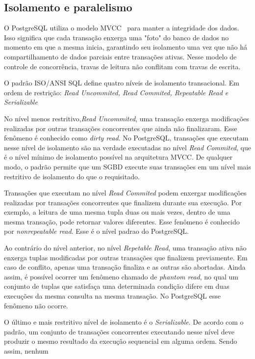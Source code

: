 \documentclass[conference]{IEEEtran}
\begin{document}
\subsection{Isolamento e paralelismo}
O PostgreSQL utiliza o modelo MVCC~\cite{NAV} para manter a integridade dos dados. Isso significa que cada transação enxerga uma "foto"
do banco de dados no momento em que a mesma inicia, garantindo seu isolamento uma vez que não há compartilhamento de dados
parciais entre transações ativas. Nesse modelo de controle de concorrência, travas de leitura não conflitam com travas de escrita.
\par O padrão ISO/ANSI SQL define quatro níveis de isolamento transacional. Em ordem de restrição: \emph{
Read Uncommited, Read Commited, Repeatable Read e Serializable}
\par No nível menos restritivo,\emph{Read Uncommited}, uma transação enxerga modificações realizadas por outras transações
concorrentes que ainda não finalizaram. Esse fenômeno é conhecido como \emph{dirty read}. No PostgreSQL, transações que executam
nesse nível de isolamento são na verdade executadas no nível \emph{Read Commited}, que é o nível mínimo de isolamento possível
na arquitetura MVCC. De qualquer modo, o padrão permite que um SGBD execute suas transações em um nível mais restritivo
de isolamento do que o requisitado.
\par Transações que executam no nível \emph{Read Commited} podem enxergar modificações realizadas por transações concorrentes
que finalizem durante sua execução. Por exemplo, a leitura de uma mesma tupla duas ou mais vezes, dentro de uma mesma transação,
pode retornar valores diferentes. Esse fenômeno é conhecido por \emph{nonrepeatable read}. Esse é o nível padrao do PostgreSQL.
\par Ao contrário do nível anterior, no nível \emph{Repetable Read}, uma transação ativa não enxerga tuplas modificadas
por outras transações que finalizem previamente. Em caso de conflito, apenas uma transação finaliza e as outras são abortadas.
Ainda assim, é possível ocorrer um fenômeno chamado de \emph{phantom read}, no qual um conjunto de tuplas que satisfaça uma
determinada condição difere em duas execuções da mesma consulta na mesma transação. No PostgreSQL esse fenômeno não ocorre.
\par O último e mais restritivo nível de isolamento é o \emph{Serializable}. De acordo com o padrão, um conjunto de transações
concorrentes executando nesse nível deve produzir o mesmo resultado da execução sequencial em alguma ordem. Sendo assim, nenhum
\end{document}

